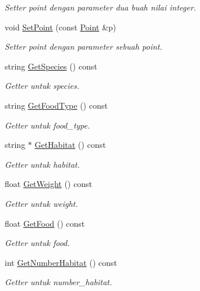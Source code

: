 \begin{DoxyCompactItemize}
\begin{DoxyCompactList}\small\item\em Setter point dengan parameter dua buah nilai integer. \end{DoxyCompactList}\item 
void \hyperlink{classAnimal_a02e187a6407bc83c46698544c912be15}{Set\+Point} (const \hyperlink{classPoint}{Point} \&p)
\begin{DoxyCompactList}\small\item\em Setter point dengan parameter sebuah point. \end{DoxyCompactList}\item 
string \hyperlink{classAnimal_a4c251e18f587980e69ec9f4c5cca3cfd}{Get\+Species} () const 
\begin{DoxyCompactList}\small\item\em Getter untuk species. \end{DoxyCompactList}\item 
string \hyperlink{classAnimal_a5517a48b723e94618de2ed908a109938}{Get\+Food\+Type} () const 
\begin{DoxyCompactList}\small\item\em Getter untuk food\+\_\+type. \end{DoxyCompactList}\item 
string $\ast$ \hyperlink{classAnimal_a07ea7b90c55213f0475ed3e7044101eb}{Get\+Habitat} () const 
\begin{DoxyCompactList}\small\item\em Getter untuk habitat. \end{DoxyCompactList}\item 
float \hyperlink{classAnimal_a84b2804414e0c5113a4fe1ca03fc3fff}{Get\+Weight} () const 
\begin{DoxyCompactList}\small\item\em Getter untuk weight. \end{DoxyCompactList}\item 
float \hyperlink{classAnimal_a284817c8f57078ebce4fd1f17d824223}{Get\+Food} () const 
\begin{DoxyCompactList}\small\item\em Getter untuk food. \end{DoxyCompactList}\item 
int \hyperlink{classAnimal_a7268c5783ff0ee4cb6e4ea9500663021}{Get\+Number\+Habitat} () const 
\begin{DoxyCompactList}\small\item\em Getter untuk number\+\_\+habitat. \end{DoxyCompactList}\item 

\end{DoxyCompactItemize}
